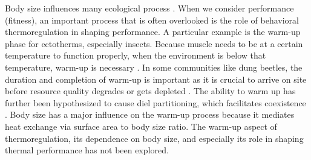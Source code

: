 Body size influences many ecological process \citep{Peters1986}.
When we consider performance (fitness), an important process that is often overlooked is the role of behavioral thermoregulation in shaping performance. 
A particular example is the warm-up phase for ectotherms, especially insects.
Because muscle needs to be at a certain temperature to function properly, when the environment is below that temperature, warm-up is necessary \citep[e.g.,][]{Heinrich1975}. 
In some communities like dung beetles, the duration and completion of warm-up is important as it is crucial to arrive on site before resource quality degrades or gets depleted \citep{Hanski1991}. %
The ability to warm up has further been hypothesized to cause diel partitioning, which facilitates coexistence \citep{Viljanen2009}.
Body size has a major influence on the warm-up process because it mediates heat exchange via surface area to body size ratio. %
The warm-up aspect of thermoregulation, its dependence on body size, and especially its role in shaping thermal performance has not been explored.
 
